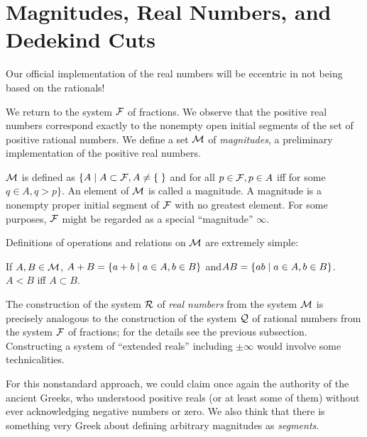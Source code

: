 \section[Magnitudes, Real Numbers, and Dedekind Cuts]{Magnitudes, Real Numbers,
and\\ Dedekind Cuts}

Our official implementation of the real numbers will be eccentric in
not being based on the rationals!

We return to the system ${\cal F}$ of fractions.  We observe
that the positive real numbers correspond exactly to the nonempty open initial
segments of the set of positive rational
numbers.  We define a set ${\cal M}$ of {\itshape magnitudes}, a preliminary
implementation of the positive real numbers.


\begin{definition}
 ${\cal M}$ is defined as $\{A \mid A \subset {\cal
 F}, A \neq \mbox{$\{\;\}$}$ and for all $p \in {\cal F}, p \in A$ iff for some $q
 \in A, q > p\}$.  An element of ${\cal M}$ is called a {\upshape
 magnitude}.  A magnitude is a nonempty proper initial
 segment of ${\cal F}$ with no greatest element.  For some
 purposes, $\cal F$ might be regarded as a special ``magnitude'' $\infty$.
\end{definition}

Definitions of operations and relations on ${\cal M}$ are extremely
simple:

\begin{definition}
 If $A, B \in {\cal M}$, $A + B = \{a + b\mid a \in
 A, b \in B\}$ and\newline $AB = \{ab \mid a \in A, b \in B\}$.  $A < B$ iff $A
 \subset B$.
\end{definition}

The construction of the system ${\cal R}$ of {\itshape real numbers\/} from the system ${\cal M}$ is precisely analogous to the
construction of the system ${\cal Q}$ of rational
numbers from the system ${\cal F}$ of fractions; for the
details see the previous subsection.
Constructing a system of ``extended reals''
including $\pm \infty$ would involve some technicalities.

For this nonstandard approach, we could claim once again the authority
of the ancient Greeks, who understood positive reals (or at least some
of them) without ever acknowledging negative numbers or zero.  We also
think that there is something very Greek about defining arbitrary
magnitudes as {\itshape segments}.

